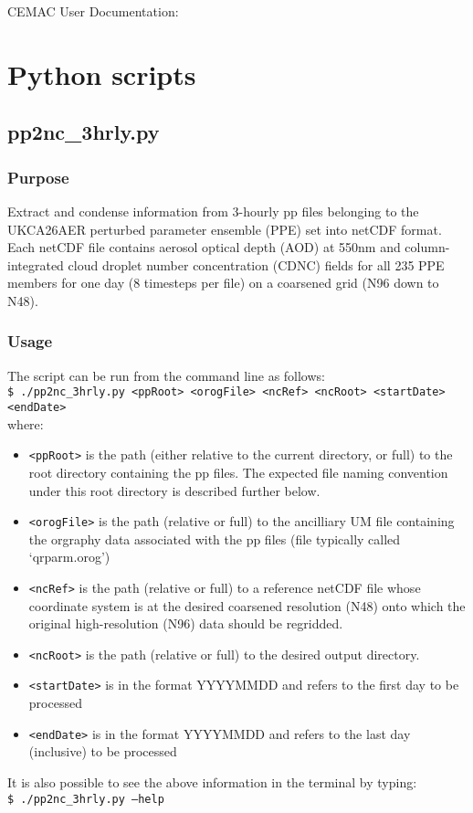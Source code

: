 \documentclass[10pt,a4paper]{article}
\newcommand\tab[1][0.5cm]{\hspace*{#1}}
\begin{document}
\begin{center}
\vspace*{0.5cm}
{\Huge CEMAC User Documentation: \Project}
\end{center}
\vspace*{0.5cm}

\section{Python scripts}

\subsection{pp2nc\_3hrly.py}

\subsubsection{Purpose}

Extract and condense information from 3-hourly pp files belonging to the UKCA26AER perturbed parameter ensemble (PPE) set into netCDF format. Each netCDF file contains aerosol optical depth (AOD) at 550nm and column-integrated cloud droplet number concentration (CDNC) fields for all 235 PPE members for one day (8 timesteps per file) on a coarsened grid (N96 down to N48).

\subsubsection{Usage}
The script can be run from the command line as follows:\\
\tab \texttt{\$ ./pp2nc\_3hrly.py <ppRoot> <orogFile> <ncRef> <ncRoot> <startDate> <endDate>}\\
where:
\begin{itemize}
\item \texttt{<ppRoot>} is the path (either relative to the current directory, or full) to the root directory containing the pp files. The expected file naming convention under this root directory is described further below.
\item \texttt{<orogFile>} is the path (relative or full) to the ancilliary UM file containing the orgraphy data associated with the pp files (file typically called `qrparm.orog')
\item \texttt{<ncRef>} is the path (relative or full) to a reference netCDF file whose coordinate system is at the desired coarsened resolution (N48) onto which the original high-resolution (N96) data should be regridded.
\item \texttt{<ncRoot>} is the path (relative or full) to the desired output directory.
\item \texttt{<startDate>} is in the format YYYYMMDD and refers to the first day to be processed
\item \texttt{<endDate>} is in the format YYYYMMDD and refers to the last day (inclusive) to be processed 
\end{itemize}
It is also possible to see the above information in the terminal by typing:\\
\tab \texttt{\$ ./pp2nc\_3hrly.py --help}
\end{document}
